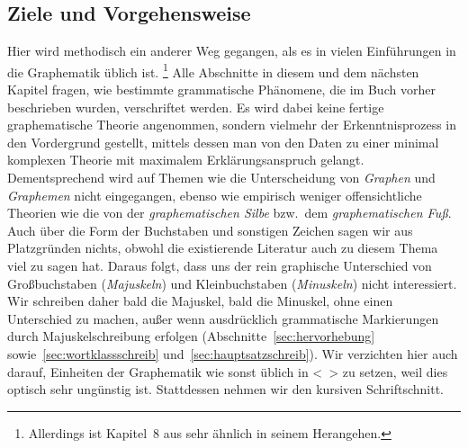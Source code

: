 \subsection{Ziele und Vorgehensweise}

Hier wird methodisch ein anderer Weg gegangen, als es in vielen Einführungen in die Graphematik üblich ist.%
\footnote{Allerdings ist Kapitel~8 aus \citet{Eisenberg2013a} sehr ähnlich in seinem Herangehen.}
Alle Abschnitte in diesem und dem nächsten Kapitel fragen, wie bestimmte grammatische Phänomene, die im Buch vorher beschrieben wurden, verschriftet werden.
Es wird dabei keine fertige graphematische Theorie angenommen, sondern vielmehr der Erkenntnisprozess in den Vordergrund gestellt, mittels dessen man von den Daten zu einer minimal komplexen Theorie mit maximalem Erklärungsanspruch gelangt.
Dementsprechend wird auf Themen wie \zB die Unterscheidung von \textit{Graphen} und \textit{Graphemen} nicht eingegangen, ebenso wie empirisch weniger offensichtliche Theorien wie die von der \textit{graphematischen Silbe} bzw.\ dem \textit{graphematischen Fuß}.
Auch über die Form der Buchstaben und sonstigen Zeichen sagen wir aus Platzgründen nichts, obwohl die existierende Literatur auch zu diesem Thema viel zu sagen hat.
Daraus folgt, dass uns der rein graphische Unterschied von Großbuchstaben (\textit{Majuskeln}) und Kleinbuchstaben (\textit{Minuskeln}) nicht interessiert.
Wir schreiben daher bald die Majuskel, bald die Minuskel, ohne einen Unterschied zu machen, außer wenn ausdrücklich grammatische Markierungen durch Majuskelschreibung erfolgen (Abschnitte~\ref{sec:hervorhebung} sowie~\ref{sec:wortklassschreib} und~\ref{sec:hauptsatzschreib}).
Wir verzichten hier auch darauf, Einheiten der Graphematik wie sonst üblich in <~> zu setzen, weil dies optisch sehr ungünstig ist.
Stattdessen nehmen wir den kursiven Schriftschnitt.

